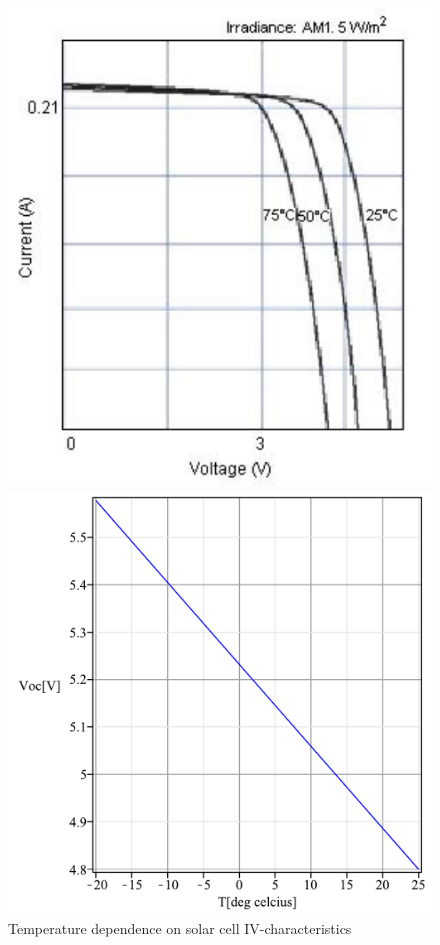\begin{figure}[H]
\begin{minipage}[t]{0.45\linewidth}
\centering
\includegraphics[height=0.28\textheight]{figures/fig_SA_MC_IV_curve}
\end{minipage}
\hspace{5mm}
\begin{minipage}[t]{0.45\linewidth}
\centering
\includegraphics[height=0.28\textheight]{figures/fig_SA_Voc_temperature_dependence}
\end{minipage}
\caption{Temperature dependence on solar cell IV-characteristics}
\label{fig:SA_IV_temperature_dependence}
\end{figure}
%
%
